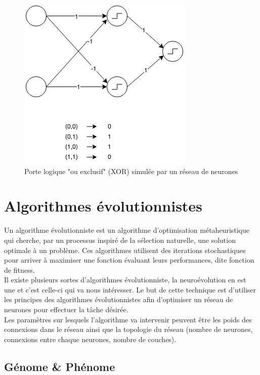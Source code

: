 \documentclass{article}
\begin{document}
\begin{figure}[h]
\begin{center}
	\includegraphics[scale=0.7]{xor.png} 
	\caption{Porte logique "ou exclusif" (XOR) simulée par un réseau de neurones}
\end{center}
\end{figure}

\newpage
\section{Algorithmes évolutionnistes}

Un algorithme évolutionniste est un algorithme d'optimisation métaheuristique qui cherche, par un processus inspiré de la sélection naturelle, une solution optimale à un problème. Ces algorithmes utilisent des iterations stochastiques pour arriver à maximiser une fonction évaluant leurs performances, dite fonction de fitness.\cite{wikiea}\\
Il existe plusieurs sortes d'algorithmes évolutionniste, la neuroévolution en est une et c'est celle-ci qui va nous intéresser. Le but de cette technique est d'utiliser les principes des algorithmes évolutionnistes afin d'optimiser un réseau de neurones pour effectuer la tâche désirée.\\
Les paramètres sur lesquels l'algorithme va intervenir peuvent être les poids des connexions dans le réseau ainsi que la topologie du réseau (nombre de neurones, connexions entre chaque neurones, nombre de couches).

\subsection{Génome \& Phénome}
\end{document}
